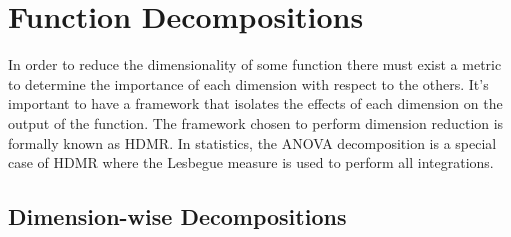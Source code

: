 \section{Function Decompositions} \label{sec:func_decomp}

In order to reduce the dimensionality of some function there must exist a metric to determine the importance of each dimension with respect to the others. It's important to have a framework that isolates the effects of each dimension on the output of the function. The framework chosen to perform dimension reduction is formally known as \ac{HDMR}. In statistics, the \ac{ANOVA} decomposition is a special case of \ac{HDMR} where the Lesbegue measure is used to perform all integrations.

\subsection{Dimension-wise Decompositions} \label{subsec:dim_wise_decomps}

